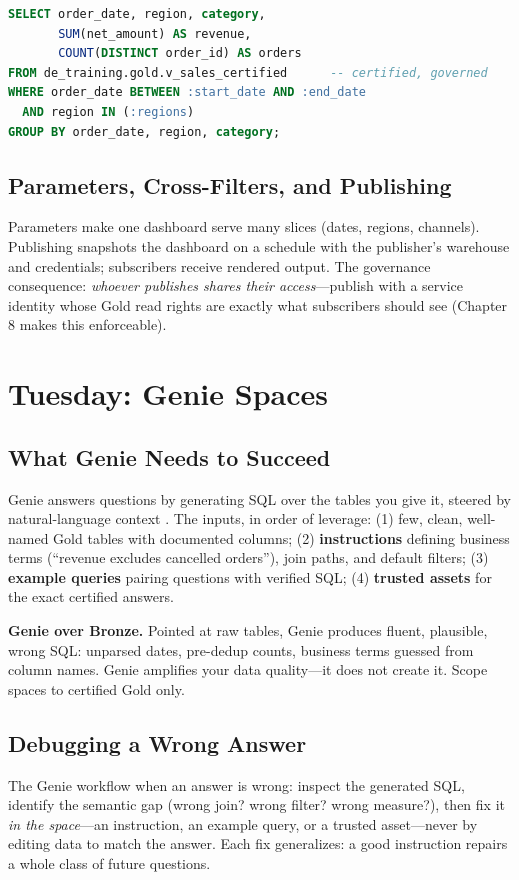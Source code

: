 \begin{lstlisting}[language=SQL,caption={A parameterized dashboard dataset over a certified view.},label={lst:ch7-dataset}]
SELECT order_date, region, category,
       SUM(net_amount) AS revenue,
       COUNT(DISTINCT order_id) AS orders
FROM de_training.gold.v_sales_certified      -- certified, governed
WHERE order_date BETWEEN :start_date AND :end_date
  AND region IN (:regions)
GROUP BY order_date, region, category;
\end{lstlisting}

\subsection{Parameters, Cross-Filters, and Publishing}
Parameters make one dashboard serve many slices (dates, regions, channels). Publishing snapshots the dashboard on a schedule with the publisher's warehouse and credentials; subscribers receive rendered output. The governance consequence: \emph{whoever publishes shares their access}---publish with a service identity whose Gold read rights are exactly what subscribers should see (Chapter 8 makes this enforceable).

\section{Tuesday: Genie Spaces}
\subsection{What Genie Needs to Succeed}
Genie answers questions by generating SQL over the tables you give it, steered by natural-language context \cite{databricksGenie}. The inputs, in order of leverage: (1) few, clean, well-named Gold tables with documented columns; (2) \textbf{instructions} defining business terms (``revenue excludes cancelled orders''), join paths, and default filters; (3) \textbf{example queries} pairing questions with verified SQL; (4) \textbf{trusted assets} for the exact certified answers.

\begin{pitfall}
\textbf{Genie over Bronze.} Pointed at raw tables, Genie produces fluent, plausible, wrong SQL: unparsed dates, pre-dedup counts, business terms guessed from column names. Genie amplifies your data quality---it does not create it. Scope spaces to certified Gold only.
\end{pitfall}

\subsection{Debugging a Wrong Answer}
The Genie workflow when an answer is wrong: inspect the generated SQL, identify the semantic gap (wrong join? wrong filter? wrong measure?), then fix it \emph{in the space}---an instruction, an example query, or a trusted asset---never by editing data to match the answer. Each fix generalizes: a good instruction repairs a whole class of future questions.

